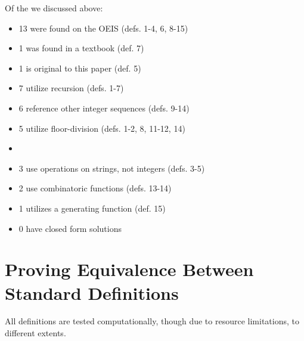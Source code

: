 \documentclass[conference]{IEEEtran}
\begin{document}
Of the \TotalOriginals we discussed above:
\begin{itemize}
    \item 13 were found on the OEIS \cite{OEIS-TMS, OEIS-TMS-inv, OEIS-TMS-pos-neg, OEIS-TMS-3-2, OEIS-TMS-inv-plus1} (defs. 1-4, 6, 8-15)
    \item 1 was found in a textbook \cite{Arndt_2010} (def. 7)
    \item 1 is original to this paper (def. 5)
    \\%
    \item 7 utilize recursion (defs. 1-7)
    \item 6 reference other integer sequences (defs. 9-14)
    \item 5 utilize floor-division (defs. 1-2, 8, 11-12, 14)
    \item {}
    \item 3 use operations on strings, not integers (defs. 3-5)
    \item 2 use combinatoric functions (defs. 13-14)
    \item 1 utilizes a generating function (def. 15)
    \item 0 have closed form solutions
\end{itemize}

\section{Proving Equivalence Between Standard Definitions}

All definitions are tested computationally, though due to resource limitations, to different extents.
\end{document}
